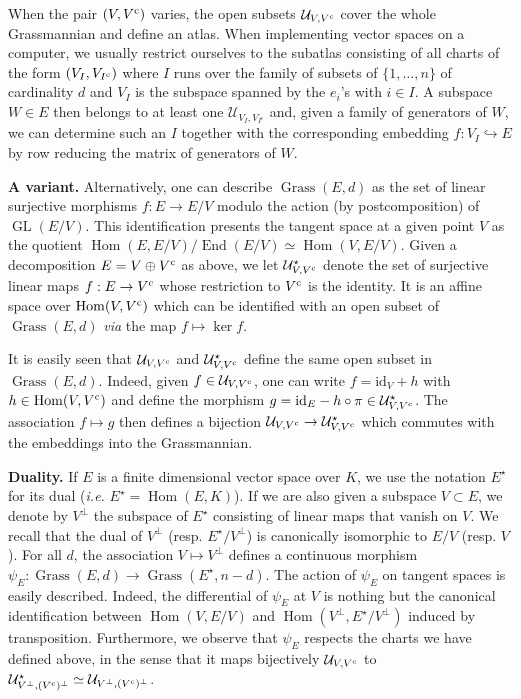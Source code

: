 \documentclass{sig-alternate-2013}
\DeclareMathOperator{\Hom}{Hom}
\DeclareMathOperator{\End}{End}
\DeclareMathOperator{\GL}{GL}
\DeclareMathOperator{\Grass}{Grass}
\newcommand{\id}{\textrm{id}}
\renewcommand{\c}{\text{\rm c}}
\begin{document}
When the pair $(V, V^\c)$ varies, the open subsets $\mathcal 
U_{V,V^\c}$ cover the whole Grassmannian and define an atlas.
When implementing vector spaces on a computer, we usually restrict 
ourselves to the subatlas consisting of all charts of the form $(V_I, 
V_{I^\c})$ where $I$ runs over the family of subsets of $\{1, 
\ldots, n\}$ of cardinality $d$ and $V_I$ is the subspace spanned by 
the $e_i$'s with $i \in I$. A subspace $W \in E$ then belongs to at 
least one $\mathcal U_{V_I, V_{I^{\text{c}}}}$ and, given a family of
generators of $W$, we can determine such an $I$ together with the
corresponding embedding $f : V_I \hookrightarrow E$ by row reducing 
the matrix of generators of $W$.

\smallskip

\noindent
{\bf A variant.}
Alternatively, one can describe $\Grass(E,d)$ as the set of linear 
surjective morphisms $f : E \to E/V$ modulo the action (by 
postcomposition) of $\GL(E/V)$. This identification presents the 
tangent space at a given point $V$ as the quotient $\Hom(E, E/V) / 
\End(E/V) \simeq \Hom(V, E/V)$.
Given a decomposition $E = V \oplus V^\c$ as above, we let $\mathcal 
U^\star_{V, V^\c}$ denote the set of surjective linear maps $f : E 
\to V^\c$ whose restriction to $V^\c$ is the identity. It is an 
affine space over $\Hom(V, V^\c)$ which can be identified with an open
subset of $\Grass(E,d)$ \emph{via} the map $f \mapsto \ker f$.

It is easily seen that $\mathcal U_{V, V^\c}$ and $\mathcal 
U^\star_{V, V^\c}$ define the same open subset in $\Grass(E,d)$. 
Indeed, given $f \in \mathcal U_{V, V^\c}$, one can write $f = \id_V 
+ h$ with $h \in \Hom(V, V^\c)$ and define the morphism $g = \id_E -
h \circ \pi \in \mathcal U^\star_{V, V^\c}$. The association $f \mapsto
g$ then defines a bijection $\mathcal U_{V, V^\c} \to \mathcal
U^\star_{V, V^\c}$ which commutes with the embeddings into the
Grassmannian.

\smallskip

\noindent
{\bf Duality.}
If $E$ is a finite dimensional vector space over $K$, we use the notation 
$E^\star$ for its dual (\emph{i.e.} $E^\star = \Hom(E,K)$). If we are also given
a subspace $V \subset E$, we denote by $V^\perp$ the subspace 
of $E^\star$ consisting of linear maps that vanish on $V$. We recall
that the dual of $V^\perp$ (resp. $E^\star/V^\perp$) is canonically
isomorphic to $E/V$ (resp. $V$).
For all $d$, the association $V \mapsto V^\perp$ defines a continuous 
morphism $\psi_E : \Grass(E,d) \to \Grass(E^\star, n-d)$. The action of 
$\psi_E$ on tangent spaces is easily described. Indeed, the differential 
of $\psi_E$ at $V$ is nothing but the canonical identification between
$\Hom(V, E/V)$ and $\Hom(V^\perp, E^\star/V^\perp)$ induced by 
transposition. Furthermore, we observe that $\psi_E$ respects
the charts we have defined above, in the sense that it maps bijectively 
$\mathcal U_{V, V^\c}$ to $\mathcal U^\star_{V^\perp, (V^\c)^\perp}
\simeq \mathcal U_{V^\perp, (V^\c)^\perp}$.
\end{document}
